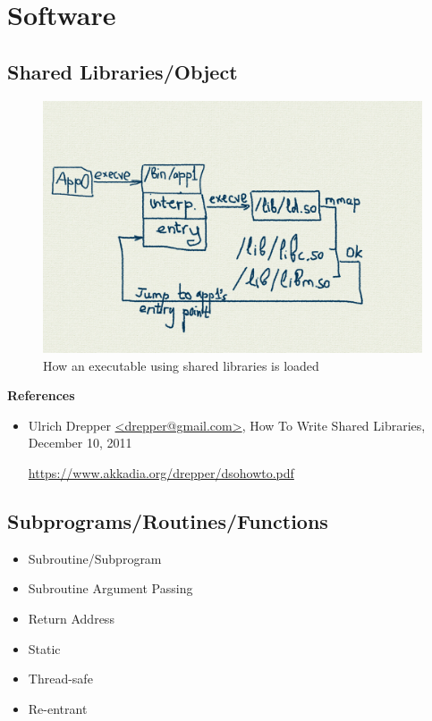 \documentclass[12pt,a4paper]{article}
\begin{document}
\section{Software}

\subsection{Shared Libraries/Object}

\begin{figure}[H]
\begin{center}
\includegraphics[width=1\textwidth]{png/ld.so.png}
\caption{How an executable using shared libraries is 
loaded}\label{fig.execve-ld.so}
\end{center}
\end{figure}

\textbf{References}

\begin{itemize}
\item Ulrich Drepper \url{<drepper@gmail.com>},
      How To Write Shared Libraries,
      December 10, 2011

      \url{https://www.akkadia.org/drepper/dsohowto.pdf}

\end{itemize}

\subsection{Subprograms/Routines/Functions}

\begin{itemize}
\item Subroutine/Subprogram
\item Subroutine Argument Passing
\item Return Address
\item Static
\item Thread-safe
\item Re-entrant
\end{itemize}
\end{document}
